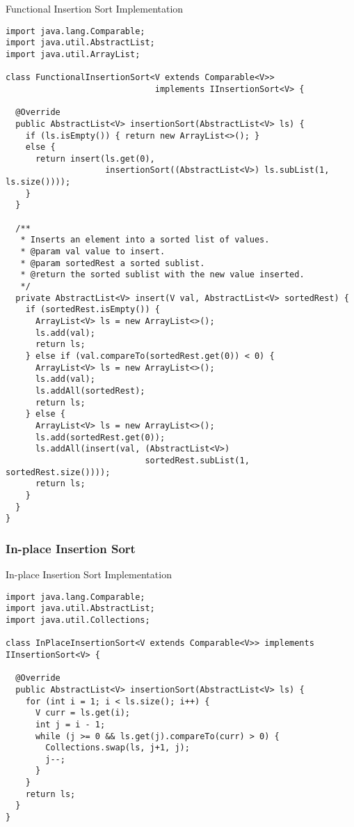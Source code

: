 \begin{cl}[]{Functional Insertion Sort Implementation}
\begin{lstlisting}[language=MyJava]
import java.lang.Comparable;
import java.util.AbstractList;
import java.util.ArrayList;

class FunctionalInsertionSort<V extends Comparable<V>> 
                              implements IInsertionSort<V> {
  
  @Override
  public AbstractList<V> insertionSort(AbstractList<V> ls) {
    if (ls.isEmpty()) { return new ArrayList<>(); }
    else { 
      return insert(ls.get(0), 
                    insertionSort((AbstractList<V>) ls.subList(1, ls.size()))); 
    }
  }

  /**
   * Inserts an element into a sorted list of values.
   * @param val value to insert.
   * @param sortedRest a sorted sublist.
   * @return the sorted sublist with the new value inserted.
   */
  private AbstractList<V> insert(V val, AbstractList<V> sortedRest) {
    if (sortedRest.isEmpty()) {
      ArrayList<V> ls = new ArrayList<>();
      ls.add(val);
      return ls;
    } else if (val.compareTo(sortedRest.get(0)) < 0) {
      ArrayList<V> ls = new ArrayList<>();
      ls.add(val);
      ls.addAll(sortedRest);
      return ls;
    } else {
      ArrayList<V> ls = new ArrayList<>();
      ls.add(sortedRest.get(0));
      ls.addAll(insert(val, (AbstractList<V>) 
                            sortedRest.subList(1, sortedRest.size())));
      return ls;
    }
  }
}
\end{lstlisting}
\end{cl}

\subsubsection*{In-place Insertion Sort}
\begin{cl}[]{In-place Insertion Sort Implementation}
\begin{lstlisting}[language=MyJava]
import java.lang.Comparable;
import java.util.AbstractList;
import java.util.Collections;

class InPlaceInsertionSort<V extends Comparable<V>> implements IInsertionSort<V> {

  @Override
  public AbstractList<V> insertionSort(AbstractList<V> ls) {
    for (int i = 1; i < ls.size(); i++) {
      V curr = ls.get(i);
      int j = i - 1;
      while (j >= 0 && ls.get(j).compareTo(curr) > 0) {
        Collections.swap(ls, j+1, j);
        j--;
      }
    }
    return ls;
  }
}
\end{lstlisting}
\end{cl}

